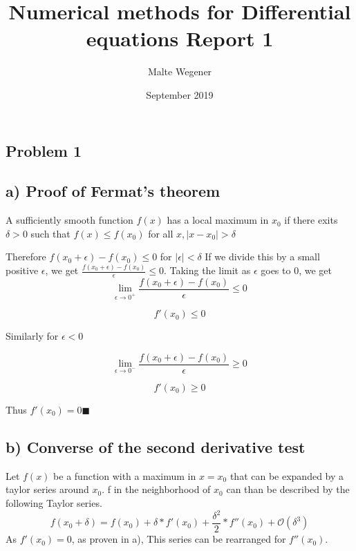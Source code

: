 \documentclass{article}
\title{Numerical methods for Differential equations Report 1}
\author{Malte Wegener}
\date{September 2019}
\begin{document}
\maketitle
\begin{multicols}{2}
    
\section{Problem 1}
\subsection{a) Proof of Fermat's theorem}

A sufficiently smooth function $f(x)$ has a local maximum in $x_{0}$ if there exits $\delta > 0$ such that $f(x) \leq f(x_{0})$ for all $x, \mid x - x_{0} \mid > \delta$ \par
Therefore $f(x_{0}+\epsilon)-f(x_{0}) \leq 0$ for $\mid \epsilon \mid < \delta$
If we divide this by a small positive $\epsilon$, we get $\frac{f(x_{0}+\epsilon)-f(x_{0})}{\epsilon}\leq 0$.
Taking the limit as $\epsilon$ goes to 0, we get
\begin{equation*}
   \lim_{\epsilon\to 0^{+}} \frac{f(x_{0}+\epsilon)-f(x_{0})}{\epsilon}\leq 0
\end{equation*}

\begin{equation*}
   f'(x_{0})\leq 0
\end{equation*}

Similarly for $\epsilon < 0$

\begin{equation*}
   \lim_{\epsilon\to 0^{-}} \frac{f(x_{0}+\epsilon)-f(x_{0})}{\epsilon}\geq 0
  \end{equation*}
   
\begin{equation*}
   f'(x_{0})\geq 0
\end{equation*}

Thus $f'(x_{0}) = 0 \blacksquare$

\subsection{b) Converse of the second derivative test}
Let $f(x)$ be a function with a maximum in $x=x_{0}$ that can be expanded by a taylor series around $x_{0}$. f in the neighborhood of $x_{0}$ can than be described by the following Taylor series.
\begin{equation*}
    f(x_{0}+\delta) = f(x_{0})+\delta*f'(x_{0})+\frac{\delta^2}{2}*f''(x_{0}) + \mathcal{O}(\delta^3)
\end{equation*}
As $f'(x_{0}) = 0$, as proven in a), This series can be rearranged for $f''(x_{0})$.


\end{multicols}
\end{document}
